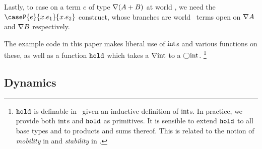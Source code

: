 \begin{abstrsyn}
Lastly, to case on a term $e$ of type $\nabla(A+B)$ at world \bbonem, we need the
$\caseP{e}{x.e_1}{x.e_2}$ construct, whose branches are world \bbonem\ terms
open on $\nabla{A}$ and $\nabla{B}$ respectively.

The example code in this paper makes liberal use of ${\rm int}$s and various
functions on these, as well as a function ${\tt hold}$ which takes a $\nabla{\rm int}$
to a $\bigcirc{\rm int}$.%
\footnote{${\tt hold}$ is definable in \lang\ given an inductive definition of
${\rm int}$s. In practice, we provide both ${\rm int}$s and ${\tt hold}$ as primitives.
It is sensible to extend ${\tt hold}$ to all base types and to products and sums
thereof. This is related to the notion of {\em mobility} in \cite{murphy05} and
{\em stability} in \cite{krishnaswami13}.}

\end{abstrsyn}

\subsection{Dynamics}
\label{sec:stagedsemantics}






